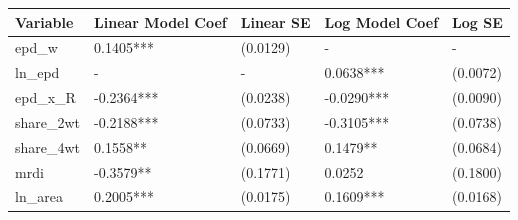 \begin{tabular}{lllll}
\toprule
 Variable   & Linear Model Coef   & Linear SE   & Log Model Coef   & Log SE   \\
\midrule
 epd\_w      & 0.1405***           & (0.0129)    & -                & -        \\
 ln\_epd     & -                   & -           & 0.0638***        & (0.0072) \\
 epd\_x\_R    & -0.2364***          & (0.0238)    & -0.0290***       & (0.0090) \\
 share\_2wt  & -0.2188***          & (0.0733)    & -0.3105***       & (0.0738) \\
 share\_4wt  & 0.1558**            & (0.0669)    & 0.1479**         & (0.0684) \\
 mrdi       & -0.3579**           & (0.1771)    & 0.0252           & (0.1800) \\
 ln\_area    & 0.2005***           & (0.0175)    & 0.1609***        & (0.0168) \\
\bottomrule
\end{tabular}